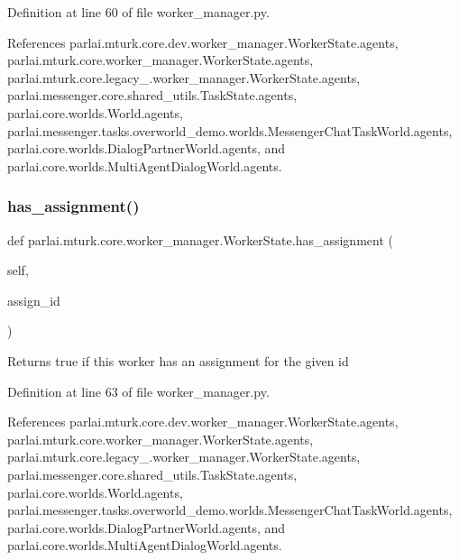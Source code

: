 Definition at line 60 of file worker\+\_\+manager.\+py.



References parlai.\+mturk.\+core.\+dev.\+worker\+\_\+manager.\+Worker\+State.\+agents, parlai.\+mturk.\+core.\+worker\+\_\+manager.\+Worker\+State.\+agents, parlai.\+mturk.\+core.\+legacy\+\_.\+worker\+\_\+manager.\+Worker\+State.\+agents, parlai.\+messenger.\+core.\+shared\+\_\+utils.\+Task\+State.\+agents, parlai.\+core.\+worlds.\+World.\+agents, parlai.\+messenger.\+tasks.\+overworld\+\_\+demo.\+worlds.\+Messenger\+Chat\+Task\+World.\+agents, parlai.\+core.\+worlds.\+Dialog\+Partner\+World.\+agents, and parlai.\+core.\+worlds.\+Multi\+Agent\+Dialog\+World.\+agents.

\mbox{\label{classparlai_1_1mturk_1_1core_1_1worker__manager_1_1WorkerState_ac2dd663b0b95b39c915e8198d825b84c}} 
\subsubsection{\texorpdfstring{has\+\_\+assignment()}{has\_assignment()}}
{\footnotesize\ttfamily def parlai.\+mturk.\+core.\+worker\+\_\+manager.\+Worker\+State.\+has\+\_\+assignment (\begin{DoxyParamCaption}\item[{}]{self,  }\item[{}]{assign\+\_\+id }\end{DoxyParamCaption})}

\begin{DoxyVerb}Returns true if this worker has an assignment for the given id\end{DoxyVerb}
 

Definition at line 63 of file worker\+\_\+manager.\+py.



References parlai.\+mturk.\+core.\+dev.\+worker\+\_\+manager.\+Worker\+State.\+agents, parlai.\+mturk.\+core.\+worker\+\_\+manager.\+Worker\+State.\+agents, parlai.\+mturk.\+core.\+legacy\+\_.\+worker\+\_\+manager.\+Worker\+State.\+agents, parlai.\+messenger.\+core.\+shared\+\_\+utils.\+Task\+State.\+agents, parlai.\+core.\+worlds.\+World.\+agents, parlai.\+messenger.\+tasks.\+overworld\+\_\+demo.\+worlds.\+Messenger\+Chat\+Task\+World.\+agents, parlai.\+core.\+worlds.\+Dialog\+Partner\+World.\+agents, and parlai.\+core.\+worlds.\+Multi\+Agent\+Dialog\+World.\+agents.



